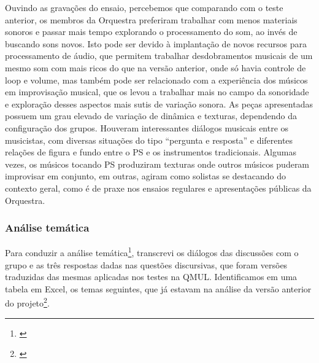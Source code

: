 Ouvindo as gravações do ensaio, percebemos que comparando com o teste anterior, os membros da Orquestra preferiram trabalhar com menos materiais sonoros e passar mais tempo explorando o processamento do som, ao invés de buscando sons novos. Isto pode ser devido à implantação de novos recursos para processamento de áudio, que permitem trabalhar desdobramentos musicais de um mesmo som com mais ricos do que na versão anterior, onde só havia controle de loop e volume, mas também pode ser relacionado com a experiência dos músicos em improvisação musical, que os levou a trabalhar mais no campo da sonoridade e exploração desses aspectos mais sutis de variação sonora. As peças apresentadas possuem um grau elevado de variação de dinâmica e texturas, dependendo da configuração dos grupos. Houveram interessantes diálogos musicais entre os musicistas, com diversas situações do tipo ``pergunta e resposta'' e diferentes relações de figura e fundo entre o PS e os instrumentos tradicionais. Algumas vezes, os músicos tocando PS produziram texturas onde outros músicos puderam improvisar em conjunto, em outras, agiram como solistas se destacando do contexto geral, como é de praxe nos ensaios regulares e apresentações públicas da Orquestra. 





\subsubsection{Análise temática}
Para conduzir a análise temática\footnote{\cite{Braun2006}}, transcrevi os diálogos das discussões com o grupo e as três respostas dadas nas questões discursivas, que foram versões traduzidas das mesmas aplicadas nos testes na QMUL. Identificamos em uma tabela em Excel, os temas seguintes, que já estavam na análise da versão anterior do projeto\footnote{\cite{Stolfi2018b}}.

